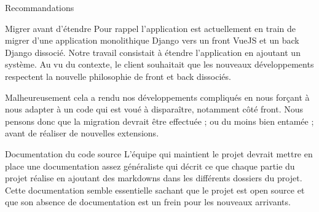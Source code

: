 \documentclass[]{article}
\begin{document}
{\begin{section}{Recommandations}
 \begin{subsection}{Migrer avant d'étendre}
     Pour rappel l'application est actuellement en train de migrer d'une application monolithique Django vers un front VueJS et un back Django dissocié. Notre travail consistait à étendre l'application en ajoutant un système. Au vu du contexte, le client souhaitait que les nouveaux développements respectent la nouvelle philosophie de front et back dissociés.

     Malheureusement cela a rendu nos développements compliqués en nous forçant à nous adapter à un code qui est voué à disparaître, notamment côté front. Nous pensons donc que la migration devrait être effectuée ; ou du moins bien entamée ; avant de réaliser de nouvelles extensions.
 \end{subsection}

 \begin{subsection}{Documentation du code source}
     L'équipe qui maintient le projet devrait mettre en place une documentation assez généraliste qui décrit ce que chaque partie du projet réalise en ajoutant des markdowns dans les différents dossiers du projet. Cette documentation semble essentielle sachant que le projet est open source et que son absence de documentation est un frein pour les nouveaux arrivants.
 \end{subsection}
\end{section}

}
\end{document}

